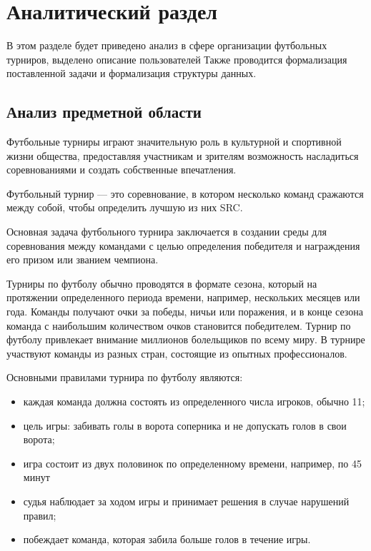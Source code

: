 \section{Аналитический раздел}

В этом разделе будет приведено анализ в сфере организации футбольных турниров, выделено описание пользователей
Также проводится формализация поставленной задачи и формализация структуры данных.

\subsection{Анализ предметной области}

Футбольные турниры играют значительную роль в культурной и спортивной жизни общества, предоставляя участникам и зрителям возможность насладиться соревнованиями и создать собственные впечатления.

Футбольный турнир --- это соревнование, в котором несколько команд сражаются между собой, чтобы определить лучшую из них SRC.

Основная задача футбольного турнира заключается в создании среды для соревнования между командами с целью определения победителя и награждения его призом или званием чемпиона.

Турниры по футболу обычно проводятся в формате сезона, который на протяжении определенного периода времени, например, нескольких месяцев или года.
Команды получают очки за победы, ничьи или поражения, и в конце сезона команда с наибольшим количеством очков становится победителем.
Турнир по футболу привлекает внимание миллионов болельщиков по всему миру. В турнире участвуют команды из разных стран, состоящие из опытных профессионалов.

Основными правилами турнира по футболу являются:
\begin{itemize}
	\item каждая команда должна состоять из определенного числа игроков, обычно 11;
	\item цель игры: забивать голы в ворота соперника и не допускать голов в свои ворота;
	\item игра состоит из двух половинок по определенному времени, например, по 45 минут
	\item судья наблюдает за ходом игры и принимает решения в случае нарушений правил;
	\item побеждает команда, которая забила больше голов в течение игры.
\end{itemize}


